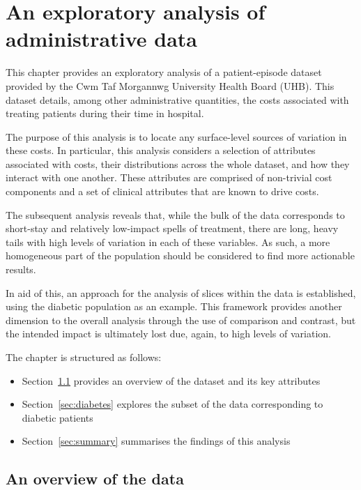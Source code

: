 \chapter{An exploratory analysis of administrative data}

\renewcommand{\texpath}{chapters/data/paper/tex}

This chapter provides an exploratory analysis of a patient-episode dataset
provided by the Cwm Taf Morgannwg University Health Board (UHB). This dataset
details, among other administrative quantities, the costs associated with
treating patients during their time in hospital.

The purpose of this analysis is to locate any surface-level sources of variation
in these costs. In particular, this analysis considers a selection of attributes
associated with costs, their distributions across the whole dataset, and how
they interact with one another. These attributes are comprised of non-trivial
cost components and a set of clinical attributes that are known to drive costs.

The subsequent analysis reveals that, while the bulk of the data corresponds to
short-stay and relatively low-impact spells of treatment, there are long, heavy
tails with high levels of variation in each of these variables. As such, a more
homogeneous part of the population should be considered to find more actionable
results.

In aid of this, an approach for the analysis of slices within the data is
established, using the diabetic population as an example. This framework
provides another dimension to the overall analysis through the use of comparison
and contrast, but the intended impact is ultimately lost due, again, to high
levels of variation.

The chapter is structured as follows:
\begin{itemize}
    \item Section~\ref{sec:overview} provides an overview of the dataset and
        its key attributes
    \item Section~\ref{sec:diabetes} explores the subset of the data
        corresponding to diabetic patients
    \item Section~\ref{sec:summary} summarises the findings of this analysis
\end{itemize}

\section{An overview of the data}\label{sec:overview}
\graphicspath{{chapters/data/paper/img/external/}}

